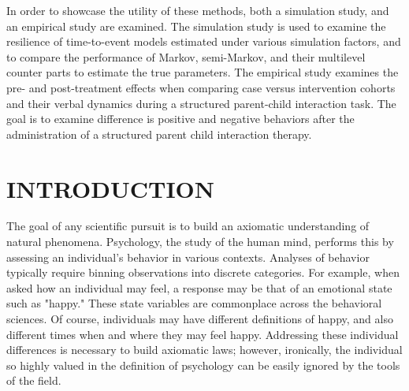 \documentclass[12pt]{./styles/outhesis}
\begin{document}
In order to showcase the utility of these methods, both a simulation study, and an empirical study are examined. The simulation study is used to examine the resilience of time-to-event models estimated under various simulation factors, and to compare the performance of Markov, semi-Markov, and their multilevel counter parts to estimate the true parameters. The empirical study examines the pre- and post-treatment effects when comparing case versus intervention cohorts and their verbal dynamics during a structured parent-child interaction task. The goal is to examine difference is positive and negative behaviors after the administration of a structured parent child interaction therapy.
\newpage
\setcounter{placeholder}{\value{page}}
\doublespacing
{}\setcounter{page}{1}

 \chapter{INTRODUCTION}\label{chap1}

The goal of any scientific pursuit is to build an axiomatic
understanding of natural phenomena. Psychology, the study of the human
mind, performs this by assessing an individual's behavior in various
contexts. Analyses of behavior typically require binning observations
into discrete categories. For example, when asked how an individual may
feel, a response may be that of an emotional state such as "happy." These
state variables are commonplace across the behavioral sciences. Of
course, individuals may have different definitions of happy, and also
different times when and where they may feel happy. Addressing these
individual differences is necessary to build axiomatic laws; however,
ironically, the individual so highly valued in the definition of
psychology can be easily ignored by the tools of the field.
\end{document}
